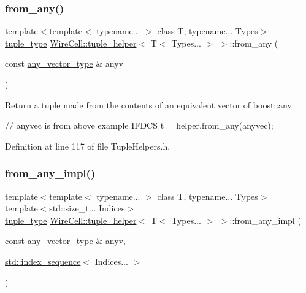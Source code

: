 \subsubsection{\texorpdfstring{from\+\_\+any()}{from\_any()}}
{\footnotesize\ttfamily template$<$template$<$ typename... $>$ class T, typename... Types$>$ \\
\hyperlink{struct_wire_cell_1_1tuple__helper_3_01_t_3_01_types_8_8_8_01_4_01_4_aef55cc988f5f41eff16f4a116bbd5fc5}{tuple\+\_\+type} \hyperlink{struct_wire_cell_1_1tuple__helper}{Wire\+Cell\+::tuple\+\_\+helper}$<$ T$<$ Types... $>$ $>$\+::from\+\_\+any (\begin{DoxyParamCaption}\item[{const \hyperlink{struct_wire_cell_1_1tuple__helper_3_01_t_3_01_types_8_8_8_01_4_01_4_a09d92f40f36eccfe85165e6ab93a6217}{any\+\_\+vector\+\_\+type} \&}]{anyv }\end{DoxyParamCaption})\hspace{0.3cm}{\ttfamily [inline]}}

Return a tuple made from the contents of an equivalent vector of boost\+::any

// anyvec is from above example I\+F\+D\+CS t = helper.\+from\+\_\+any(anyvec); 

Definition at line 117 of file Tuple\+Helpers.\+h.

\mbox{\label{struct_wire_cell_1_1tuple__helper_3_01_t_3_01_types_8_8_8_01_4_01_4_a4f9e5b34091dcc6c12f0440f00db33ed}} 
\subsubsection{\texorpdfstring{from\+\_\+any\+\_\+impl()}{from\_any\_impl()}}
{\footnotesize\ttfamily template$<$template$<$ typename... $>$ class T, typename... Types$>$ \\
template$<$std\+::size\+\_\+t... Indices$>$ \\
\hyperlink{struct_wire_cell_1_1tuple__helper_3_01_t_3_01_types_8_8_8_01_4_01_4_aef55cc988f5f41eff16f4a116bbd5fc5}{tuple\+\_\+type} \hyperlink{struct_wire_cell_1_1tuple__helper}{Wire\+Cell\+::tuple\+\_\+helper}$<$ T$<$ Types... $>$ $>$\+::from\+\_\+any\+\_\+impl (\begin{DoxyParamCaption}\item[{const \hyperlink{struct_wire_cell_1_1tuple__helper_3_01_t_3_01_types_8_8_8_01_4_01_4_a09d92f40f36eccfe85165e6ab93a6217}{any\+\_\+vector\+\_\+type} \&}]{anyv,  }\item[{\hyperlink{structstd_1_1index__sequence}{std\+::index\+\_\+sequence}$<$ Indices... $>$}]{ }\end{DoxyParamCaption})\hspace{0.3cm}{\ttfamily [inline]}}



